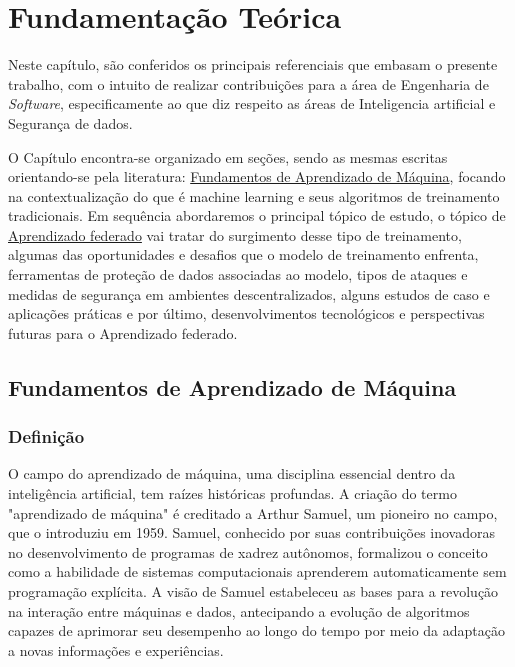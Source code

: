 \chapter[Fundamentação Teorica]{Fundamentação Teórica}
\label{chap:teorico}

Neste capítulo, são conferidos os principais referenciais que embasam o presente trabalho, com o intuito de realizar contribuições para a área de Engenharia de \emph{Software}, especificamente ao que diz respeito as áreas de Inteligencia artificial e Segurança de dados.

O Capítulo encontra-se organizado em seções, sendo as mesmas escritas orientando-se pela literatura:
\hyperref[sec:fundamentos]{Fundamentos de Aprendizado de Máquina}, focando na contextualização do que é machine learning e seus algoritmos de treinamento tradicionais. Em sequência abordaremos o principal tópico de estudo, o tópico de \hyperref[sec:federado]{Aprendizado federado} vai tratar do surgimento desse tipo de treinamento, algumas das oportunidades e desafios que o modelo de treinamento enfrenta, ferramentas de proteção de dados associadas ao modelo, tipos de ataques e medidas de segurança em ambientes descentralizados, alguns estudos de caso e aplicações práticas e por último, desenvolvimentos tecnológicos e perspectivas futuras para o Aprendizado federado.

\section{Fundamentos de Aprendizado de Máquina}
\label{sec:fundamentos}

\subsection{Definição}

O campo do aprendizado de máquina, uma disciplina essencial dentro da inteligência artificial, tem raízes históricas profundas. A criação do termo "aprendizado de máquina" é creditado a Arthur Samuel, um pioneiro no campo, que o introduziu em 1959\cite{samuel1959}. Samuel, conhecido por suas contribuições inovadoras no desenvolvimento de programas de xadrez autônomos, formalizou o conceito como a habilidade de sistemas computacionais aprenderem automaticamente sem programação explícita. A visão de Samuel estabeleceu as bases para a revolução na interação entre máquinas e dados, antecipando a evolução de algoritmos capazes de aprimorar seu desempenho ao longo do tempo por meio da adaptação a novas informações e experiências.

